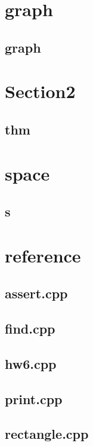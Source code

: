 \section{graph}
    \subsection{graph}
        


\section{Section2}
    \subsection{thm}
        

\section{space}
    \subsection{s}
        


\section{reference}
    \subsection{assert.cpp}
        
    \subsection{find.cpp}
        
    \subsection{hw6.cpp}
        
    \subsection{print.cpp}
        
    \subsection{rectangle.cpp}
        
